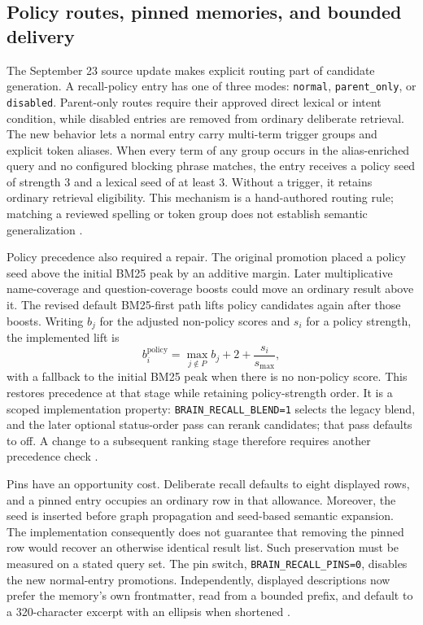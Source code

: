 \subsection{Policy routes, pinned memories, and bounded delivery}
\label{sec:policy_delivery_update}

The September 23 source update makes explicit routing part of candidate generation. A recall-policy entry has one of three modes: \texttt{normal}, \texttt{parent\_only}, or \texttt{disabled}. Parent-only routes require their approved direct lexical or intent condition, while disabled entries are removed from ordinary deliberate retrieval. The new behavior lets a normal entry carry multi-term trigger groups and explicit token aliases. When every term of any group occurs in the alias-enriched query and no configured blocking phrase matches, the entry receives a policy seed of strength $3$ and a lexical seed of at least $3$. Without a trigger, it retains ordinary retrieval eligibility. This mechanism is a hand-authored routing rule; matching a reviewed spelling or token group does not establish semantic generalization \citep{brainrecall20260923,recallpolicy20260923}.

Policy precedence also required a repair. The original promotion placed a policy seed above the initial BM25 peak by an additive margin. Later multiplicative name-coverage and question-coverage boosts could move an ordinary result above it. The revised default BM25-first path lifts policy candidates again after those boosts. Writing $b_j$ for the adjusted non-policy scores and $s_i$ for a policy strength, the implemented lift is
\[
 b_i^{\mathrm{policy}}
 = \max_{j\notin P} b_j + 2 + \frac{s_i}{s_{\max}},
\]
with a fallback to the initial BM25 peak when there is no non-policy score. This restores precedence at that stage while retaining policy-strength order. It is a scoped implementation property: \texttt{BRAIN\_RECALL\_BLEND=1} selects the legacy blend, and the later optional status-order pass can rerank candidates; that pass defaults to off. A change to a subsequent ranking stage therefore requires another precedence check \citep{brainrecall20260923}.

Pins have an opportunity cost. Deliberate recall defaults to eight displayed rows, and a pinned entry occupies an ordinary row in that allowance. Moreover, the seed is inserted before graph propagation and seed-based semantic expansion. The implementation consequently does not guarantee that removing the pinned row would recover an otherwise identical result list. Such preservation must be measured on a stated query set. The pin switch, \texttt{BRAIN\_RECALL\_PINS=0}, disables the new normal-entry promotions. Independently, displayed descriptions now prefer the memory's own frontmatter, read from a bounded prefix, and default to a 320-character excerpt with an ellipsis when shortened \citep{brainrecall20260923}.

